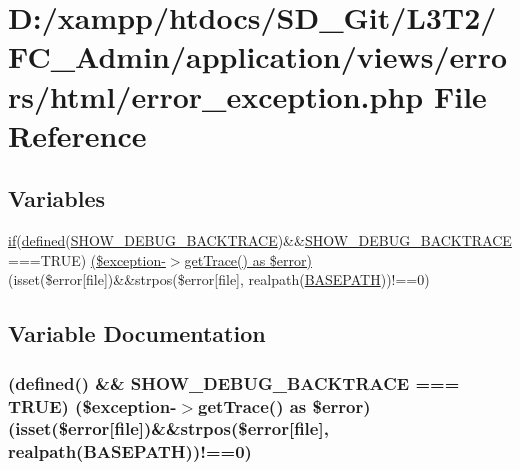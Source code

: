 \hypertarget{html_2error__exception_8php}{}\section{D\+:/xampp/htdocs/\+S\+D\+\_\+\+Git/\+L3\+T2/\+F\+C\+\_\+\+Admin/application/views/errors/html/error\+\_\+exception.php File Reference}
\label{html_2error__exception_8php}
\subsection*{Variables}
\begin{DoxyCompactItemize}
\item 
\hyperlink{assets_2js_2bootstrap_8min_8js_a87cf461060832b8b68a7b48d9e371e4f}{if}(\hyperlink{_bootstrap_8php_a46458e8654a714e0565e20f63021add9}{defined}(\textquotesingle{}\hyperlink{constants_8php_a7e2dd6fea73799257285946411aeb5ce}{S\+H\+O\+W\+\_\+\+D\+E\+B\+U\+G\+\_\+\+B\+A\+C\+K\+T\+R\+A\+C\+E}\textquotesingle{})\&\&\hyperlink{constants_8php_a7e2dd6fea73799257285946411aeb5ce}{S\+H\+O\+W\+\_\+\+D\+E\+B\+U\+G\+\_\+\+B\+A\+C\+K\+T\+R\+A\+C\+E}===T\+R\+U\+E) \hyperlink{html_2error__exception_8php_a58b3444cff3fa104c28c2111a147e3d3}{(\$exception-\/$>$get\+Trace() as \$error)} (isset(\$error\mbox{[}\textquotesingle{}file\textquotesingle{}\mbox{]})\&\&strpos(\$error\mbox{[}\textquotesingle{}file\textquotesingle{}\mbox{]}, realpath(\hyperlink{index_8php_ad39801cabfd338dc5524466fe793fda9}{B\+A\+S\+E\+P\+A\+T\+H}))!==0)
\end{DoxyCompactItemize}


\subsection{Variable Documentation}
\hypertarget{html_2error__exception_8php_a58b3444cff3fa104c28c2111a147e3d3}{}
\subsubsection[{(\$exception-\/$>$get\+Trace() as \$error)}]{({\bf defined}(\textquotesingle{}) \&\& {\bf S\+H\+O\+W\+\_\+\+D\+E\+B\+U\+G\+\_\+\+B\+A\+C\+K\+T\+R\+A\+C\+E} === T\+R\+U\+E) (\$exception-\/$>$get\+Trace() as \$error)(isset(\$error\mbox{[}\textquotesingle{}file\textquotesingle{}\mbox{]})\&\&strpos(\$error\mbox{[}\textquotesingle{}file\textquotesingle{}\mbox{]}, realpath({\bf B\+A\+S\+E\+P\+A\+T\+H}))!==0)}\label{html_2error__exception_8php_a58b3444cff3fa104c28c2111a147e3d3}
